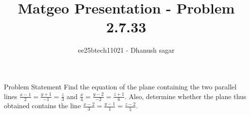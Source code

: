 \documentclass{beamer}
\title{Matgeo Presentation - Problem 2.7.33}
\author{ee25btech11021 - Dhanush sagar}
\numberwithin{equation}{section}
\theoremstyle{remark}
\begin{document}
	

		




\begin{frame}
  \titlepage
\end{frame}

\begin{frame}{Problem Statement}
Find the equation of the plane containing the two parallel lines 
$\frac{x-1}{2} = \frac{y+1}{-1} = \frac{z}{3}$ and 
$\frac{x}{4} = \frac{y-2}{-2} = \frac{z+1}{6}$. 
Also, determine whether the plane thus obtained contains the line 
$\frac{x-2}{3} = \frac{y-1}{1} = \frac{z-2}{5}$.\\
\end{frame}
\end{document}
